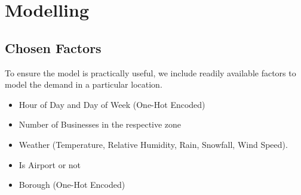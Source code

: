 \documentclass[11pt]{article}
\begin{document}
\begin{figure}[H]
\begin{floatrow}
\end{floatrow}
\end{figure}

\section{Modelling}
\subsection{Chosen Factors}
To ensure the model is practically useful, we include readily available factors to model the demand in a particular location.
\begin{itemize} 
    \item Hour of Day and Day of Week (One-Hot Encoded)
    \item Number of Businesses in the respective zone
    \item Weather (Temperature, Relative Humidity, Rain, Snowfall, Wind Speed).
    \item Is Airport or not
    \item Borough (One-Hot Encoded)
\end{itemize}
\end{document}
